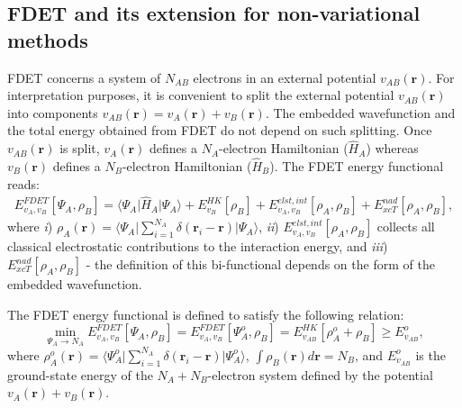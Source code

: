 \documentclass[amsmath,amssymb,preprint,aip,jcp]{revtex4-1}
\begin{document}
\subsection{FDET and its extension for non-variational methods}
FDET concerns a system of $N_{AB}$ electrons in an external potential $v_{AB}(\mathbf{r})$.
For interpretation purposes, it is convenient to split the external potential $v_{AB}(\mathbf{r})$ into components $v_{AB}(\mathbf{r})=v_{A}(\mathbf{r})+v_{B}(\mathbf{r})$. 
The embedded wavefunction and the total energy obtained from FDET do not depend on such splitting. 
Once $v_{AB}(\mathbf{r})$ is split, $v_{A}(\mathbf{r})$ defines a $N_A$-electron Hamiltonian ($\hat{H}_A$) whereas 
$v_{B}(\mathbf{r})$ defines a $N_B$-electron Hamiltonian ($\hat{H}_B$). 
The FDET energy functional reads: 
\begin{eqnarray} 
\label{eq:E_FDET_v'}
{E}_{v_A,v_B}^{FDET}[\Psi_{A},\rho_B] = \langle\Psi_{A}\vert \hat{H}_A\vert \Psi_{A}\rangle + E^{HK}_{v_B}[\rho_B] + E^{elst,int}_{v_A,v_B}[\rho_A,\rho_B] + E_{xcT}^{nad}[\rho_A,\rho_B], 
\end{eqnarray}
where {\it i}) $\rho_A(\mathbf{r})=\langle\Psi_A\vert\sum_{i=1}^{N_{A}}\delta(\mathbf{r}_i-\mathbf{r})\vert\Psi_A\rangle$,
{\it ii}) $E^{elst,int}_{v_A,v_B}[\rho_A,\rho_B]$ collects all classical electrostatic contributions to the interaction energy, and 
{\it iii}) $E_{xcT}^{nad}[\rho_A,\rho_B]$ - the definition of this bi-functional depends on the form of the embedded wavefunction\cite{Wesolowski2008}.

The FDET energy functional is defined to satisfy the following relation:
\begin{equation}\label{eq:nfund}
\min_{\Psi_A\rightarrow N_A} E_{v_{A},{v_B}}^{FDET}[\Psi_{A},\rho_B] = E_{v_{A},{v_B}}^{FDET}[\Psi^{o}_{A},\rho_B] = E_{v_{AB}}^{HK}[\rho_A^{o}+\rho_B] \ge E_{v_{AB}}^o,
\end{equation}
where $\rho_A^{{o}}(\mathbf{r})=\langle\Psi_A^{{o}}\vert\sum_{i=1}^{N_{A}}\delta(\mathbf{r}_i-\mathbf{r})\vert\Psi_A^{{o}}\rangle$, $\int\rho_B(\mathbf{r})d\mathbf{r}=N_B$, and $E_{v_{AB}}^o$ is the ground-state energy of the $N_A+N_B$-electron system defined by the potential $v_{A}(\mathbf{r})+v_{B}(\mathbf{r})$.
\end{document}
